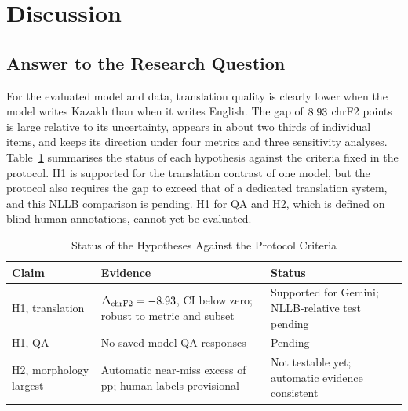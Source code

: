 \section{Discussion}
\label{sec:discussion}

\subsection{Answer to the Research Question}
For the evaluated model and data, translation quality is clearly lower when the model writes Kazakh than when it writes English. The gap of $8.93$ chrF2 points is large relative to its uncertainty, appears in about two thirds of individual items, and keeps its direction under four metrics and three sensitivity analyses. Table~\ref{tab:hyp} summarises the status of each hypothesis against the criteria fixed in the protocol. H1 is supported for the translation contrast of one model, but the protocol also requires the gap to exceed that of a dedicated translation system, and this NLLB comparison is pending. H1 for QA and H2, which is defined on blind human annotations, cannot yet be evaluated.

\begin{table}[!t]
\centering
\caption{Status of the Hypotheses Against the Protocol Criteria}
\label{tab:hyp}
\footnotesize
\begin{tabular}{@{}p{2.0cm}p{3.4cm}p{2.3cm}@{}}
\toprule
Claim & Evidence & Status \\
\midrule
H1, translation & $\Delta_{\mathrm{chrF2}}=-8.93$, CI below zero; robust to metric and subset & Supported for Gemini; NLLB-relative test pending \\
H1, QA & No saved model QA responses & Pending \\
H2, morphology largest & Automatic near-miss excess of \NmDiff{} pp; human labels provisional & Not testable yet; automatic evidence consistent \\
\bottomrule
\end{tabular}
\end{table}

